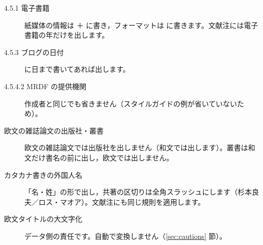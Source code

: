 \begin{description}
\item[4.5.1 電子書籍]
紙媒体の情報は ＋ に書き，フォーマットは  に書きます。文献注には電子書籍の年だけを出します。
\item[4.5.3 ブログの日付]
 に日まで書いてあれば出します。
\item[4.5.4.2 MRDF の提供機関]
作成者と同じでも省きません（スタイルガイドの例が省いていないため）。
\item[欧文の雑誌論文の出版社・叢書]
欧文の雑誌論文では出版社を出しません（和文では出します）。叢書は和文だけ書名の前に出し，欧文では出しません。
\item[カタカナ書きの外国人名]
「名・姓」の形で出し，共著の区切りは全角スラッシュにします（杉本良夫／ロス・マオア）。文献注にも同じ規則を適用します。
\item[欧文タイトルの大文字化]
データ側の責任です。自動で変換しません（\ref{sec:cautions} 節）。
\end{description}
